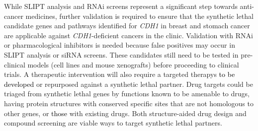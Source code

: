 
While \gls{SLIPT} analysis and \gls{RNAi} screens represent a significant step towards anti-cancer medicines, further validation is required to ensure that the \gls{synthetic lethal} candidate genes and pathways identified for \textit{CDH1} in breast and stomach cancer are applicable against \textit{CDH1}-deficient cancers in the clinic.  Validation with \gls{RNAi} or pharmacological inhibitors is needed because false positives may occur in \gls{SLIPT} analysis or \gls{siRNA} screens. These candidates still need to be tested in pre-clinical models (cell lines and mouse xenografts) before proceeding to clinical trials. A therapeutic intervention will also require a \glspl{targeted therapy} \textcolor{black}{to be developed} or repurposed against a \gls{synthetic lethal} partner. 
Drug targets could be triaged from \gls{synthetic lethal} genes by functions known to be amenable to drugs, having protein structures with conserved specific sites that are not homologous to other genes, or \textcolor{black}{those} with existing drugs. Both structure-aided drug design and compound screening are viable ways to target \gls{synthetic lethal} partners. %

